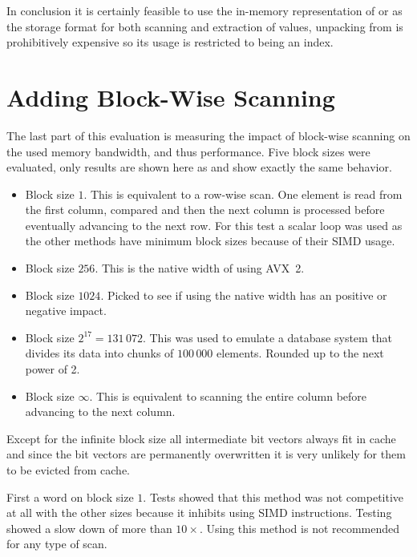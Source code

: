 In conclusion it is certainly feasible to use the in-memory representation of
\simdscan{} or \bs{} as the storage format for both scanning and extraction of
values, unpacking from \bwv{} is prohibitively expensive so its usage is
restricted to being an index.

\section{Adding Block-Wise Scanning}

The last part of this evaluation is measuring the impact of block-wise scanning
on the used memory bandwidth, and thus performance. Five block sizes were
evaluated, only \bwv{} results are shown here as \simdscan{} and \bs{} show
exactly the same behavior.

\begin{itemize}
  \item Block size $1$. This is equivalent to a row-wise scan. One element is read
    from the first column, compared and then the next column is processed before
    eventually advancing to the next row. For this test a scalar loop was used
    as the other methods have minimum block sizes because of their SIMD usage.
  \item Block size $256$. This is the native width of \bwv{} using AVX~2.
  \item Block size $1024$. Picked to see if using the native width has an
    positive or negative impact.
  \item Block size $2^{17}=131\,072$. This was used to emulate a database system
    that divides its data into chunks of $100\,000$ elements. Rounded up to the
    next power of 2.
  \item Block size $\infty$. This is equivalent to scanning the entire column
    before advancing to the next column.
\end{itemize}

Except for the infinite block size all intermediate bit vectors always fit in
cache and since the bit vectors are permanently overwritten it is very unlikely
for them to be evicted from cache.

First a word on block size $1$. Tests showed that this method was not
competitive at all with the other sizes because it inhibits using SIMD
instructions. Testing showed a slow down of more than $10\times$. Using this
method is not recommended for any type of scan.

